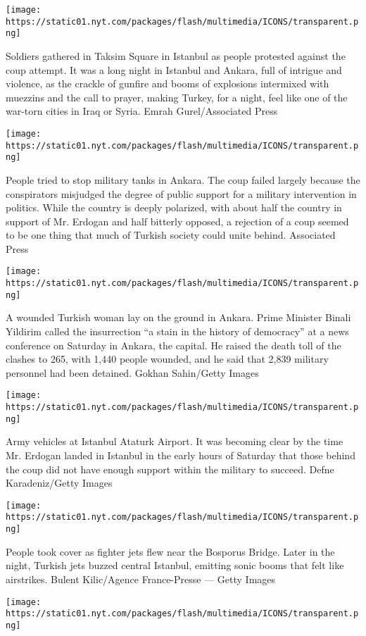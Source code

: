 \texttt{[image: https://static01.nyt.com/packages/flash/multimedia/ICONS/transparent.png]}

Soldiers gathered in Taksim Square in Istanbul as people protested
against the coup attempt. It was a long night in Istanbul and Ankara,
full of intrigue and violence, as the crackle of gunfire and booms of
explosions intermixed with muezzins and the call to prayer, making
Turkey, for a night, feel like one of the war-torn cities in Iraq or
Syria. Emrah Gurel/Associated Press

\texttt{[image: https://static01.nyt.com/packages/flash/multimedia/ICONS/transparent.png]}

People tried to stop military tanks in Ankara. The coup failed largely
because the conspirators misjudged the degree of public support for a
military intervention in politics. While the country is deeply
polarized, with about half the country in support of Mr. Erdogan and
half bitterly opposed, a rejection of a coup seemed to be one thing that
much of Turkish society could unite behind. Associated Press

\texttt{[image: https://static01.nyt.com/packages/flash/multimedia/ICONS/transparent.png]}

A wounded Turkish woman lay on the ground in Ankara. Prime Minister
Binali Yildirim called the insurrection ``a stain in the history of
democracy'' at a news conference on Saturday in Ankara, the capital. He
raised the death toll of the clashes to 265, with 1,440 people wounded,
and he said that 2,839 military personnel had been detained. Gokhan
Sahin/Getty Images

\texttt{[image: https://static01.nyt.com/packages/flash/multimedia/ICONS/transparent.png]}

Army vehicles at Istanbul Ataturk Airport. It was becoming clear by the
time Mr. Erdogan landed in Istanbul in the early hours of Saturday that
those behind the coup did not have enough support within the military to
succeed. Defne Karadeniz/Getty Images

\texttt{[image: https://static01.nyt.com/packages/flash/multimedia/ICONS/transparent.png]}

People took cover as fighter jets flew near the Bosporus Bridge. Later
in the night, Turkish jets buzzed central Istanbul, emitting sonic booms
that felt like airstrikes. Bulent Kilic/Agence France-Presse --- Getty
Images

\texttt{[image: https://static01.nyt.com/packages/flash/multimedia/ICONS/transparent.png]}

